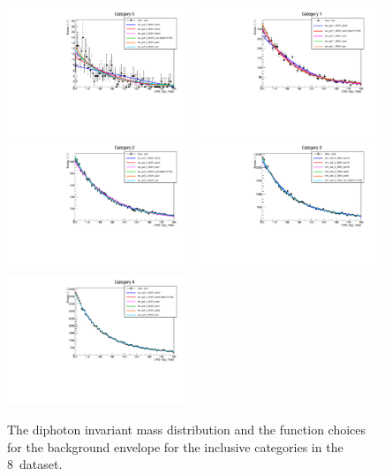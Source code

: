 \begin{figure}
  \includegraphics[width=0.49\textwidth]{ch5_anal_and_results/plots/mva_8TeV/multipdf_cat0.pdf}
  \includegraphics[width=0.49\textwidth]{ch5_anal_and_results/plots/mva_8TeV/multipdf_cat1.pdf}\\
  \includegraphics[width=0.49\textwidth]{ch5_anal_and_results/plots/mva_8TeV/multipdf_cat2.pdf}
  \includegraphics[width=0.49\textwidth]{ch5_anal_and_results/plots/mva_8TeV/multipdf_cat3.pdf}\\
  \includegraphics[width=0.49\textwidth]{ch5_anal_and_results/plots/mva_8TeV/multipdf_cat4.pdf}
  \caption{The diphoton invariant mass distribution and the function choices for the background envelope for the inclusive categories in the 8~\TeV dataset. }
  \label{fig:multipdf4}
\end{figure}

